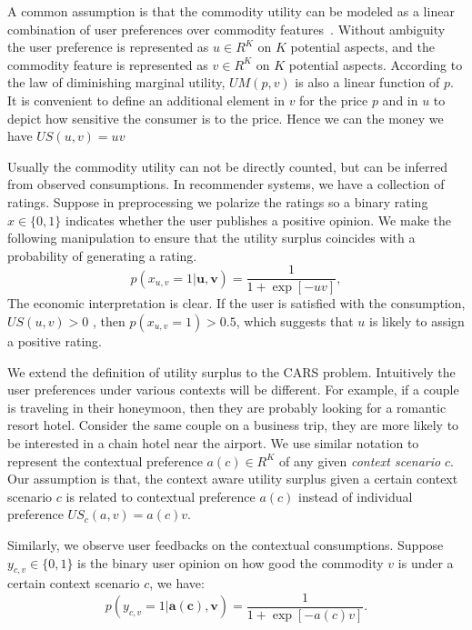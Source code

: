 \documentclass{llncs}
\begin{document}
A common assumption is that the commodity utility can be modeled as a linear combination of user preferences over commodity features~\cite{}.  Without ambiguity the user preference is represented as $u \in R^K$ on $K$ potential aspects, and the commodity feature is represented as $v\in R^K$ on $K$ potential aspects. According to the law of diminishing marginal utility, $UM(p,v)$ is also a linear
function of $p$. It is convenient to define an additional element in $v$ for the price $p$ and in $u$ to depict how sensitive the consumer is to the price. Hence we can the money we have $US(u,v)=uv$

Usually the commodity utility can not be directly counted, but can be inferred from observed consumptions. In recommender systems, we have a collection of ratings. Suppose in preprocessing we polarize the ratings so a binary rating $x\in\{0,1\}$ indicates whether the user publishes a positive opinion. We make the following manipulation to ensure that the utility surplus coincides with a probability of generating a rating.
\begin{equation}\label{equ:utility}
p(x_{u,v}=1|\mathbf{u,v})=\frac{1}{1+\exp{[-uv]}}, 
\end{equation}
The economic interpretation is clear. If the user is satisfied with the consumption, $US(u,v)>0$ , then $p(x_{u,v}=1)>0.5$, which suggests that $u$ is likely to assign a positive rating.



We extend the definition of utility surplus to the CARS problem. Intuitively the user preferences under various contexts will be different. For example, if a couple is traveling in their honeymoon, then they are probably looking for a romantic resort hotel.  Consider the same couple on a business trip, they are more likely to be interested  in a chain hotel near the airport. We use similar notation to represent the contextual preference $a(c)\in R^K$ of any given {\em context scenario} $c$. Our assumption is that, the context aware utility surplus given a certain context scenario $c$ is related to contextual preference $a(c)$ instead of individual preference $US_c(a,v)=a(c)v$. 

Similarly, we observe user feedbacks on the contextual consumptions. Suppose $y_{c,v} \in \{0,1\}$ is the binary user opinion on how good the commodity $v$ is under a certain context scenario $c$, we have:
\begin{equation}\label{equ:contextualutility}
p(y_{c,v}=1|\mathbf{a(c),v})=\frac{1}{1+\exp{[-a(c)v]}}.
\end{equation}
\end{document}
